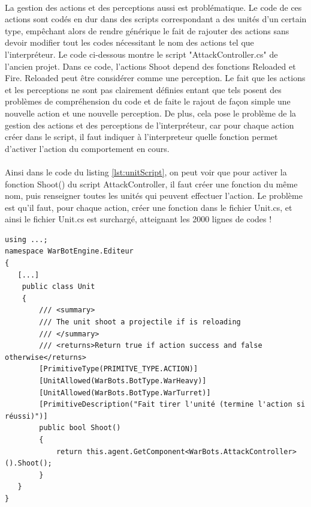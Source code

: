 \documentclass{report}
\begin{document}
\paragraph{} La gestion des actions et des perceptions aussi est problématique. Le code de ces actions sont codés en dur dans des scripts correspondant a des unités d'un certain type, empêchant alors de rendre générique le fait de rajouter des actions sans devoir modifier tout les codes nécessitant le nom des actions tel que l’interpréteur. Le code ci-dessous montre le script "AttackController.cs" de l'ancien projet. Dans ce code, l'actions Shoot depend des fonctions Reloaded et Fire. Reloaded peut être considérer comme une perception. Le fait que les actions et les perceptions ne sont pas clairement définies entant que tels posent des problèmes de compréhension du code et de faite le rajout de façon simple une nouvelle action et une nouvelle perception. De plus, cela pose le problème de la gestion des actions et des perceptions de l’interpréteur, car pour chaque action créer dans le script, il faut indiquer à l'interpreteur quelle fonction permet d'activer l'action du comportement en cours. 
\paragraph{}Ainsi dans le code du listing \ref{lst:unitScript}, on peut voir que pour activer la fonction Shoot() du script AttackController, il faut créer une fonction du même nom, puis renseigner toutes les unités qui peuvent effectuer l'action. Le problème est qu'il faut, pour chaque action, créer une fonction dans le fichier Unit.cs, et ainsi le fichier Unit.cs est surchargé, atteignant les 2000 lignes de codes !

\begin{lstlisting}[language={[Sharp]C},label={lst:unitScript}, caption=  Extrait du code du script Unit.cs]
using ...;
namespace WarBotEngine.Editeur
{
   [...]
	public class Unit
    {
        /// <summary>
        /// The unit shoot a projectile if is reloading
        /// </summary>
        /// <returns>Return true if action success and false otherwise</returns>
        [PrimitiveType(PRIMITVE_TYPE.ACTION)]
        [UnitAllowed(WarBots.BotType.WarHeavy)]
        [UnitAllowed(WarBots.BotType.WarTurret)]
        [PrimitiveDescription("Fait tirer l'unité (termine l'action si réussi)")]
        public bool Shoot()
        {
            return this.agent.GetComponent<WarBots.AttackController>().Shoot();
        }
   }
}

\end{lstlisting}
\end{document}
